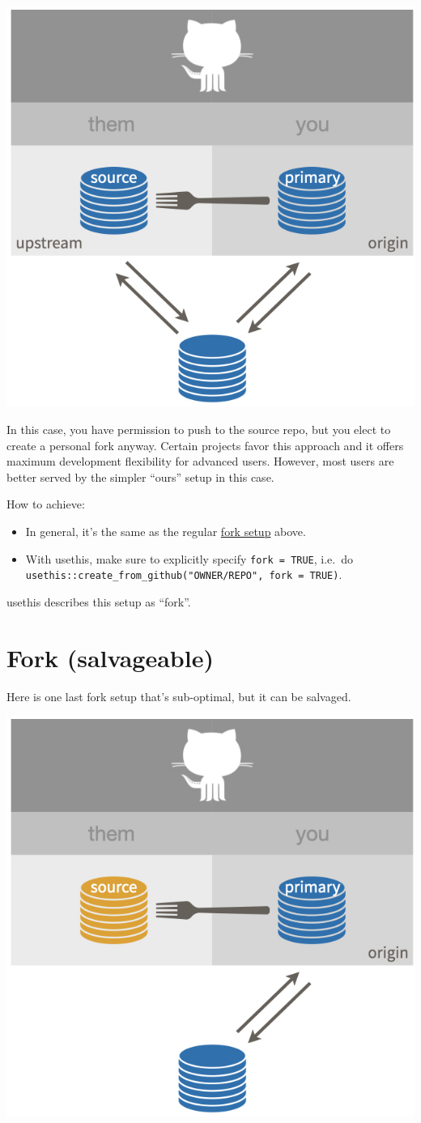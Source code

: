 \documentclass[
]{book}
\providecommand{\tightlist}{%
  \setlength{\itemsep}{0pt}\setlength{\parskip}{0pt}}
\begin{document}
\begin{center}\includegraphics[width=0.6\linewidth]{img/fork-ours} \end{center}

In this case, you have permission to push to the source repo, but you elect to create a personal fork anyway.
Certain projects favor this approach and it offers maximum development flexibility for advanced users.
However, most users are better served by the simpler ``ours'' setup in this case.

How to achieve:

\begin{itemize}
\tightlist
\item
  In general, it's the same as the regular \hyperref[fork-them]{fork setup} above.
\item
  With usethis, make sure to explicitly specify \texttt{fork\ =\ TRUE}, i.e.~do
  \texttt{usethis::create\_from\_github("OWNER/REPO",\ fork\ =\ TRUE)}.
\end{itemize}

usethis describes this setup as ``fork''.

\section{Fork (salvageable)}\label{fork_upstream_is_not_origin_parent}

Here is one last fork setup that's sub-optimal, but it can be salvaged.

\begin{center}\includegraphics[width=0.6\linewidth]{img/fork_upstream_is_not_origin_parent} \end{center}
\end{document}
